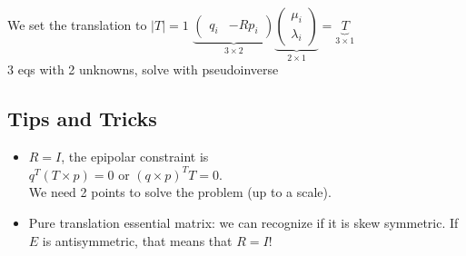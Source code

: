 We set the translation to $|T| = 1$
$\underbrace{\begin{pmatrix}q_i & -R p_i\end{pmatrix}}_{3\times2}
\underbrace{\begin{pmatrix} \mu_i \\\lambda_i \end{pmatrix}}_{2\times1} =
\underbrace{T}_{3 \times 1}$\\
3 eqs with 2 unknowns, solve with pseudoinverse

\subsection*{Tips and Tricks}
\begin{itemize}
  \item $R = I$, the epipolar constraint is\\
    $q^T ( T \times p) = 0$ or $(q \times p)^T T = 0$.\\
    We need 2 points to solve the problem (up to a scale).
  \item Pure translation essential matrix: we can recognize if it is
    skew symmetric. If $E$ is antisymmetric, that means that $R = I$!
\end{itemize}
